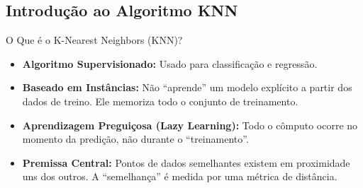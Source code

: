 \documentclass{beamer}
\begin{document}
\subsection{Introdução ao Algoritmo KNN}

\begin{frame}{O Que é o K-Nearest Neighbors (KNN)?}
    \begin{itemize}
        \item \textbf{Algoritmo Supervisionado:} Usado para classificação e regressão.
        \item \textbf{Baseado em Instâncias:} Não ``aprende'' um modelo explícito a partir dos dados de treino. Ele memoriza todo o conjunto de treinamento.
        \item \textbf{Aprendizagem Preguiçosa (Lazy Learning):} Todo o cômputo ocorre no momento da predição, não durante o ``treinamento''.
        \item \textbf{Premissa Central:} Pontos de dados semelhantes existem em proximidade uns dos outros. A ``semelhança'' é medida por uma métrica de distância.
    \end{itemize}
\end{frame}

\end{document}
